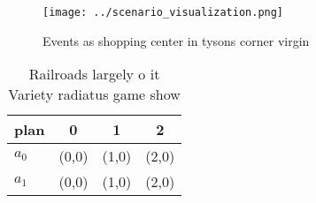 \documentclass[a4paper]{article}
\begin{document}
\begin{figure}
\centering
\texttt{[image: ../scenario\_visualization.png]}
\caption{Events as shopping center in tysons corner virgin
}
\end{figure}
 
\begin{table}
\begin{adjustbox}{width=0.5\columnwidth}
\begin{tabular}{|l|l|l|l|}
\hline
\textbf{plan} & \multicolumn{1}{c|}{\textbf{0}} & \multicolumn{1}{c|}{\textbf{1}} & \multicolumn{1}{c|}{\textbf{2}} \\ \hline
\textbf{$a_0$}  & (0,0) & (1,0) & (2,0) \\ \hline
\textbf{$a_1$}  & (0,0) & (1,0) & (2,0) \\ \hline
\end{tabular}
\end{adjustbox}
\caption{Railroads largely o it Variety radiatus game show
}
\end{table}
\end{document}
